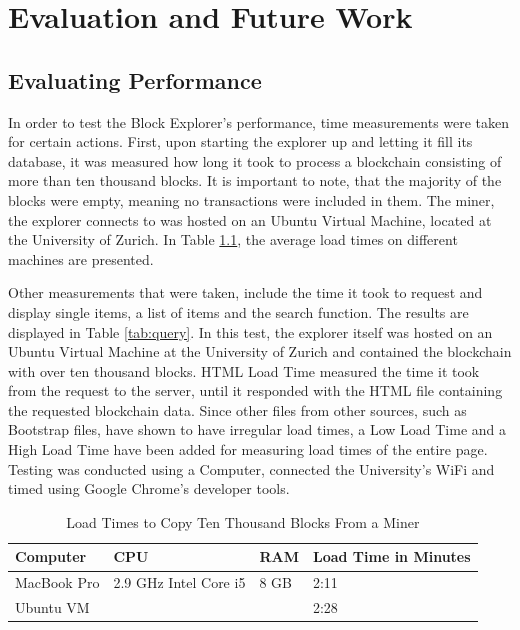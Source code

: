 \chapter{Evaluation and Future Work}
\section{Evaluating Performance}

In order to test the Block Explorer's performance, time measurements were taken for certain actions. First, upon starting the explorer up and letting it fill its database, it was measured how long it took to process a blockchain consisting of more than ten thousand blocks. It is important to note, that the majority of the blocks were empty, meaning no transactions were included in them. The miner, the explorer connects to was hosted on an Ubuntu \cite{ubuntu} Virtual Machine, located at the University of Zurich. In Table \ref{tab:load}, the average load times on different machines are presented.

Other measurements that were taken, include the time it took to request and display single items, a list of items and the search function. The results are displayed in Table \ref{tab:query}. In this test, the explorer itself was hosted on an Ubuntu Virtual Machine at the University of Zurich and contained the blockchain with over ten thousand blocks. HTML Load Time measured the time it took from the request to the server, until it responded with the HTML file containing the requested blockchain data. Since other files from other sources, such as Bootstrap files, have shown to have irregular load times, a Low Load Time and a High Load Time have been added for measuring load times of the entire page. Testing was conducted using a Computer, connected the University's WiFi and timed using Google Chrome's \cite{chrome} developer tools.

\begin{table}[]
\centering
\caption{Load Times to Copy Ten Thousand Blocks From a Miner}
\label{tab:load}
\begin{tabular}{|l|l|l|l|}
\hline
\textbf{Computer} & \textbf{CPU} & \textbf{RAM} & \textbf{Load Time in Minutes} \\ \hline
MacBook Pro & 2.9 GHz Intel Core i5 & 8 GB & 2:11 \\ \hline
Ubuntu VM &  &  & 2:28 \\ \hline
\end{tabular}
\end{table}

